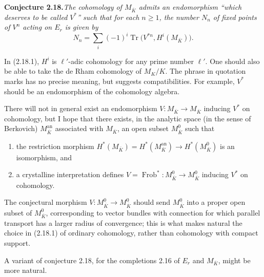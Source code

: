 \documentclass[11pt]{article}
\newcommand{\Frob}{\operatorname{Frob}}
\newcommand{\Tr}{\operatorname{Tr}}
\begin{document}
\noindent\textbf{Conjecture 2.18.}\quad\textit{The cohomology of \(M_{\overline K}\) admits an endomorphism ``which deserves to be called \(V^*\)'' such that for each \(n\geq 1\), the number \(N_n\) of fixed points of \(V^n\) acting on \(E_r\) is given by}
\begin{equation}
N_n=\sum_i(-1)^i\Tr\bigl(V^{*n},H^i(M_{\overline K})\bigr).
\tag{2.18.1}
\end{equation}

In (2.18.1), \(H^i\) is \(\ell'\)-adic cohomology for any prime number \(\ell'\). One should also be able to take the de Rham cohomology of \(M_K/K\). The phrase in quotation marks has no precise meaning, but suggests compatibilities. For example, \(V^*\) should be an endomorphism of the cohomology algebra.

There will not in general exist an endomorphism \(V:M_{\overline K}\to M_{\overline K}\) inducing \(V^*\) on cohomology, but I hope that there exists, in the analytic space (in the sense of Berkovich) \(M_{\overline K}^{\mathrm{an}}\) associated with \(M_{\overline K}\), an open subset \(M_{\overline K}^0\) such that
\begin{enumerate}[label=(\alph*),leftmargin=2.5em]
\item the restriction morphism \(H^*(M_{\overline K})=H^*(M_{\overline K}^{\mathrm{an}})\to H^*(M_{\overline K}^0)\) is an isomorphism, and
\item a crystalline interpretation defines \(V=\Frob^*:M_{\overline K}^0\to M_{\overline K}^0\) inducing \(V^*\) on cohomology.
\end{enumerate}
The conjectural morphism \(V:M_{\overline K}^0\to M_{\overline K}^0\) should send \(M_{\overline K}^0\) into a proper open subset of \(M_{\overline K}^0\), corresponding to vector bundles with connection for which parallel transport has a larger radius of convergence; this is what makes natural the choice in (2.18.1) of ordinary cohomology, rather than cohomology with compact support.

A variant of conjecture 2.18, for the completions 2.16 of \(E_r\) and \(M_{\overline K}\), might be more natural.
\end{document}
